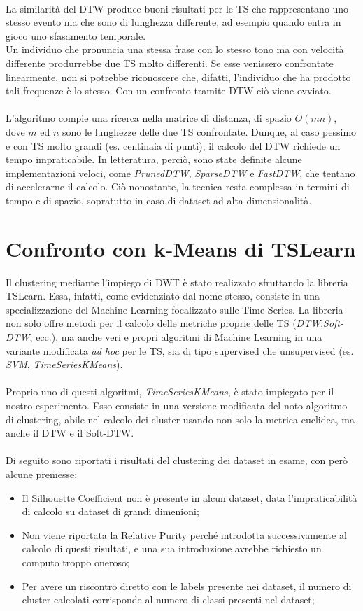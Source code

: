 \\
La similarità del DTW produce buoni risultati per le TS che rappresentano uno stesso evento ma che sono di lunghezza differente, ad esempio quando entra in gioco uno sfasamento temporale.\\
Un individuo che pronuncia una stessa frase con lo stesso tono ma con velocità differente produrrebbe due TS molto differenti. Se esse venissero confrontate linearmente, non si potrebbe riconoscere che, difatti, l'individuo che ha prodotto tali frequenze è lo stesso. Con un confronto tramite DTW ciò viene ovviato.\\
\\
L'algoritmo compie una ricerca nella matrice di distanza, di spazio $O(mn)$, dove $m$ ed $n$ sono le lunghezze delle due TS confrontate.
Dunque, al caso pessimo e con TS molto grandi (es. centinaia di punti), il calcolo del DTW richiede un tempo impraticabile. In letteratura, perciò, sono state definite alcune implementazioni veloci, come \textit{PrunedDTW}, \textit{SparseDTW} e \textit{FastDTW}, che tentano di accelerarne il calcolo. Ciò nonostante, la tecnica resta complessa in termini di tempo e di spazio, sopratutto in caso di dataset ad alta dimensionalità.\\

\section{Confronto con k-Means di TSLearn}
Il clustering mediante l'impiego di DWT è stato realizzato sfruttando la libreria TSLearn.
Essa, infatti, come evidenziato dal nome stesso, consiste in una specializzazione del Machine Learning focalizzato sulle Time Series.
La libreria non solo offre metodi per il calcolo delle metriche proprie delle TS (\textit{DTW},\textit{Soft-DTW}, ecc.), ma anche veri e propri algoritmi di Machine Learning in una variante modificata \textit{ad hoc} per le TS, sia di tipo supervised che unsupervised (es. \textit{SVM}, \textit{TimeSeriesKMeans}).\\
\\
Proprio uno di questi algoritmi, \textit{TimeSeriesKMeans}, è stato impiegato per il nostro esperimento.
Esso consiste in una versione modificata del noto algoritmo di clustering, abile nel calcolo dei cluster usando non solo la metrica euclidea, ma anche il DTW e il Soft-DTW.\\
\\
Di seguito sono riportati i risultati del clustering dei dataset in esame, con però alcune premesse:
\begin{itemize}
	\item Il Silhouette Coefficient non è presente in alcun dataset, data l'impraticabilità di calcolo su dataset di grandi dimenioni;
	\item Non viene riportata la Relative Purity perché introdotta successivamente al calcolo di questi risultati, e una sua introduzione avrebbe richiesto un computo troppo oneroso;
	\item Per avere un riscontro diretto con le labels presente nei dataset, il numero di cluster calcolati corrisponde al numero di classi presenti nel dataset;
\end{itemize}

